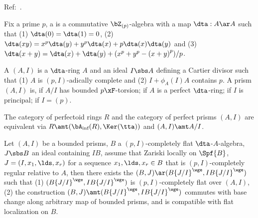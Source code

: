 \documentclass[article, a4paper, twoside]{universal}
\begin{document}











Ref:~\cite{BS2022Prisms}.

\begin{dfn}
	Fix a prime $p$, a  is a commutative $\bZ_{(p)}$-algebra with a map $\dta:A\ar A$ such that (1) $\dta(0)=\dta(1)=0$, (2) $\dta(xy)=x^{p}\dta(y)+y^{p}\dta(x)+p\dta(x)\dta(y)$ and (3) $\dta(x+y)=\dta(x)+\dta(y)+(x^{p}+y^{p}-{(x+y)}^{p})/p$.

	A  $(A,I)$ is a $\dta$-ring $A$ and an ideal $I\sbs A$ defining a Cartier divisor such that (1) $A$ is $(p,I)$-adically complete and (2) $I+\phi_{A}(I)A$ contains $p$. A prism $(A,I)$ is,  if $A/I$ has bounded $p\xF$-torsion;  if $A$ is a perfect $\dta$-ring;  if $I$ is principal;  if $I=(p)$.
\end{dfn}

\begin{thm}
	The category of perfectoid rings $R$ and the category of perfect prisms $(A,I)$ are equivalent via $R\amt(\bA_{\text{inf}}(R),\Ker(\tta))$ and $(A,I)\amt A/I$.
\end{thm}

\begin{thm}
	Let $(A,I)$ be a bounded prisms, $B$ a $(p,I)$-completely flat $\dta$-$A$-algebra, $J\sbs B$ an ideal containing $IB$, assume that Zariski locally on $\Spf{B}$, $J=(I,x_{1},\lds,x_{r})$ for a sequence $x_{1},\lds,x_{r}\in B$ that is $(p,I)$-completely regular relative to $A$, then there exists the  $(B,J)\ar (B{\{J/I\}}^{\wge},IB{\{J/I\}}^{\wge})$ such that (1) $(B{\{J/I\}}^{\wge},IB{\{J/I\}}^{\wge})$ is $(p,I)$-completely flat over $(A,I)$, (2) the construction $(B,J)\amt (B{\{J/I\}}^{\wge},IB{\{J/I\}}^{\wge})$ commutes with base change along arbitrary map of bounded prisms, and is compatible with flat localization on $B$.
\end{thm}
\end{document}

